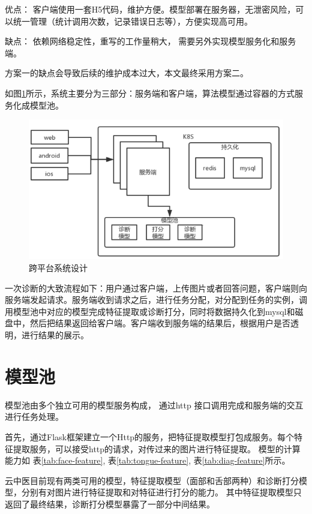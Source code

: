 优点： 客户端使用一套H5代码，维护方便。模型部署在服务器，无泄密风险，可以统一管理（统计调用次数，记录错误日志等），方便实现高可用。

缺点： 依赖网络稳定性，重写的工作量稍大， 需要另外实现模型服务化和服务端。

方案一的缺点会导致后续的维护成本过大，本文最终采用方案二。

如图\ref{fig:system}所示，系统主要分为三部分：服务端和客户端，算法模型通过容器的方式服务化成模型池。

\begin{figure}[ht]
    \centering
    \includegraphics[width=12cm]{images/system.png}
    \caption{跨平台系统设计}
    \label{fig:system}
\end{figure}

一次诊断的大致流程如下：用户通过客户端，上传图片或者回答问题，客户端则向服务端发起请求。服务端收到请求之后，进行任务分配，对分配到任务的实例，调用模型池中对应的模型完成特征提取或诊断打分，同时将数据持久化到mysql和磁盘中，然后把结果返回给客户端。客户端收到服务端的结果后，根据用户是否透明，进行结果的展示。

\section{模型池}

模型池由多个独立可用的模型服务构成， 通过http 接口调用完成和服务端的交互进行任务处理。

首先，通过Flask框架建立一个Http的服务，把特征提取模型打包成服务。每个特征提取服务，可以接受http的请求，对传过来的图片进行特征提取。
模型的计算能力如 表\ref{tab:face-feature}, 表\ref{tab:tongue-feature}, 表\ref{tab:diag-feature}所示。

云中医目前现有两类可用的模型，特征提取模型（面部和舌部两种）和诊断打分模型，分别有对图片进行特征提取和对特征进行打分的能力。
其中特征提取模型只返回了最终结果，诊断打分模型暴露了一部分中间结果。

